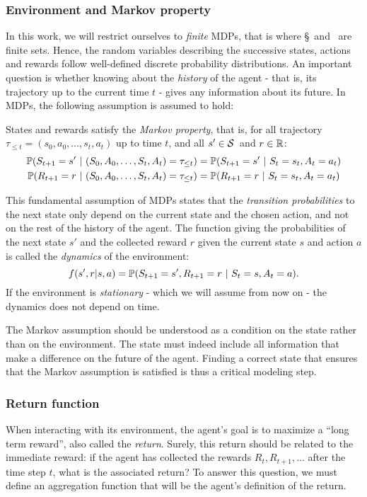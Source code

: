 			\subsubsection{Environment and Markov property} 
				In this work, we will restrict ourselves to\emph{ finite} MDPs, that is where \S~and \A~are finite sets. Hence, the random variables describing the successive states, actions and rewards follow well-defined discrete probability distributions. An important question is whether knowing about the\emph{ history} of the agent - that is, its trajectory up to the current time $t$ - gives any information about its future. In MDPs, the following assumption is assumed to hold:
				\begin{assumption}
					States and rewards satisfy the\emph{ Markov property}, that is, for all trajectory $\tau_{\leq t} = (s_0, a_0, \hdots, s_t, a_t)$ up to time $t$, and all $s'\in\S$~and $r\in\R$:
					\begin{align}
						\P(S_{t+1} = s'~|~(S_0, A_0, \hdots, S_t, A_t) = \tau_{\leq t}) & = \P(S_{t+1} = s'~|~S_t=s_t, A_t=a_t) \label{eq:markov assumption state}\\
						\P(R_{t+1} = r~|~(S_0, A_0, \hdots, S_t, A_t) = \tau_{\leq t}) & = \P(R_{t+1} = r~|~S_t=s_t, A_t=a_t) \label{eq:markov assumption reward}
					\end{align}
				\end{assumption}
				This fundamental assumption of MDPs states that the\emph{ transition probabilities} to the next state only depend on the current state and the chosen action, and not on the rest of the history of the agent. The function giving the probabilities of the next state $s'$ and the collected reward $r$ given the current state $s$ and action $a$ is called the\emph{ dynamics} of the environment:
				\begin{equation}
					f(s', r | s, a) = \P(S_{t+1} = s', R_{t+1} = r~|~S_t=s, A_t=a). \label{eq:dynamics}
				\end{equation}
				If the environment is\emph{ stationary} - which we will assume from now on - the dynamics does not depend on time.\par
				The Markov assumption should be understood as a condition on the state rather than on the environment. The state must indeed include all information that make a difference on the future of the agent. Finding a correct state that ensures that the Markov assumption is satisfied is thus a critical modeling step.
			\subsubsection{Return function}
				When interacting with its environment, the agent's goal is to maximize a \enquote{long term reward}, also called the\emph{ return}. Surely, this return should be related to the immediate reward: if the agent has collected the rewards $R_t, R_{t+1}, \hdots$ after the time step $t$, what is the associated return? To answer this question, we must define an aggregation function that will be the agent's definition of the return.
